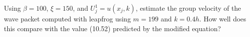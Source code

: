 Using $\beta = 100$, $\xi = 150$, and $U_j^1 = u(x_j, k)$, estimate the group velocity of the wave packet computed with
leapfrog using $m = 199$ and $k = 0.4h$. How well does this compare with the value (10.52) predicted by the modified
equation?

\begin{solution}\ \\\\
    \hfill\vfill
    \ \\
\end{solution}